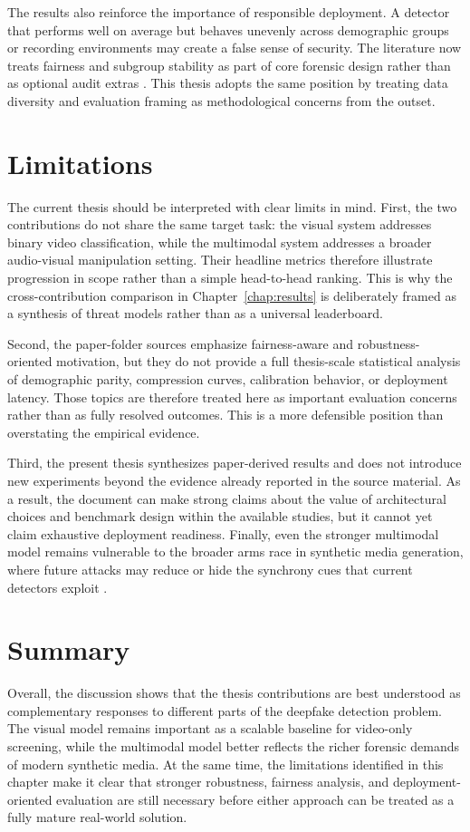 The results also reinforce the importance of responsible deployment. A detector that performs well on average but behaves unevenly across demographic groups or recording environments may create a false sense of security. The literature now treats fairness and subgroup stability as part of core forensic design rather than as optional audit extras \cite{Ju2024Fairness,fu2025unbiased,mubarak2023survey}. This thesis adopts the same position by treating data diversity and evaluation framing as methodological concerns from the outset.

\section{Limitations}

The current thesis should be interpreted with clear limits in mind. First, the two contributions do not share the same target task: the visual system addresses binary video classification, while the multimodal system addresses a broader audio-visual manipulation setting. Their headline metrics therefore illustrate progression in scope rather than a simple head-to-head ranking. This is why the cross-contribution comparison in Chapter~\ref{chap:results} is deliberately framed as a synthesis of threat models rather than as a universal leaderboard.

Second, the paper-folder sources emphasize fairness-aware and robustness-oriented motivation, but they do not provide a full thesis-scale statistical analysis of demographic parity, compression curves, calibration behavior, or deployment latency. Those topics are therefore treated here as important evaluation concerns rather than as fully resolved outcomes. This is a more defensible position than overstating the empirical evidence.

Third, the present thesis synthesizes paper-derived results and does not introduce new experiments beyond the evidence already reported in the source material. As a result, the document can make strong claims about the value of architectural choices and benchmark design within the available studies, but it cannot yet claim exhaustive deployment readiness. Finally, even the stronger multimodal model remains vulnerable to the broader arms race in synthetic media generation, where future attacks may reduce or hide the synchrony cues that current detectors exploit \cite{mubarak2023survey,dissanayake2025review}.

\section{Summary}

Overall, the discussion shows that the thesis contributions are best understood as complementary responses to different parts of the deepfake detection problem. The visual model remains important as a scalable baseline for video-only screening, while the multimodal model better reflects the richer forensic demands of modern synthetic media. At the same time, the limitations identified in this chapter make it clear that stronger robustness, fairness analysis, and deployment-oriented evaluation are still necessary before either approach can be treated as a fully mature real-world solution.